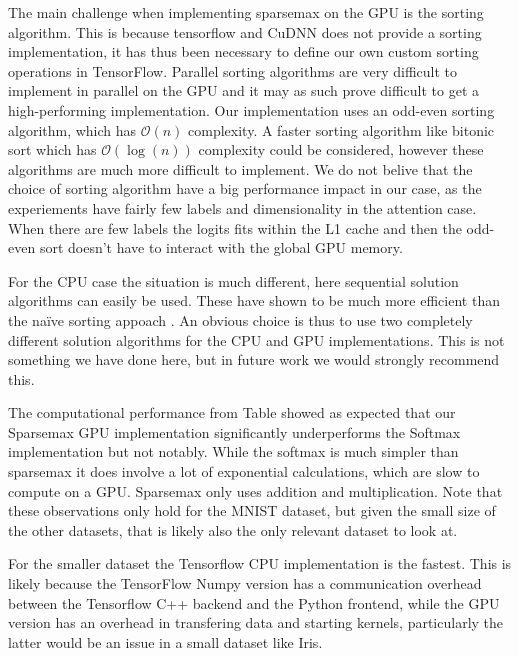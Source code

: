 The main challenge when implementing sparsemax on the GPU is the sorting algorithm. This is because tensorflow and CuDNN does not provide a sorting implementation, it has thus been necessary to define our own custom sorting operations in TensorFlow. Parallel sorting algorithms are very difficult to implement in parallel on the GPU and it may as such prove difficult to get a high-performing implementation. Our implementation uses an odd-even sorting algorithm, which has $\mathcal{O}(n)$ complexity. A faster sorting algorithm like bitonic sort which has $\mathcal{O}(\log(n))$ complexity could be considered, however these algorithms are much more difficult to implement. We do not belive that the choice of sorting algorithm have a big performance impact in our case, as the experiements have fairly few labels and dimensionality in the attention case. When there are few labels the logits fits within the L1 cache and then the odd-even sort doesn't have to interact with the global GPU memory. 

For the CPU case the situation is much different, here sequential solution algorithms can easily be used. These have shown to be much more efficient than the naïve sorting appoach \cite{Liu2016}. An obvious choice is thus to use two completely different solution algorithms for the CPU and GPU implementations. This is not something we have done here, but in future work we would strongly recommend this.

The computational performance from Table \label{tab:timings} showed as expected that our Sparsemax GPU implementation significantly underperforms the Softmax implementation but not notably. While the softmax is much simpler than sparsemax it does involve a lot of exponential calculations, which are slow to compute on a GPU. Sparsemax only uses addition and multiplication. Note that these observations only hold for the MNIST dataset, but given the small size of the other datasets, that is likely also the only relevant dataset to look at.

For the smaller dataset the Tensorflow CPU implementation is the fastest. This is likely because the TensorFlow Numpy version has a communication overhead between the Tensorflow C++ backend and the Python frontend, while the GPU version has an overhead in transfering data and starting kernels, particularly the latter would be an issue in a small dataset like Iris.

